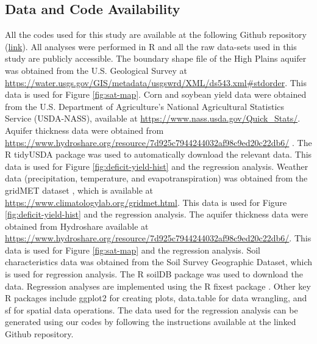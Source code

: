 \documentclass[
]{article}
\begin{document}
\hypertarget{data-and-code-availability}{%
\subsection{Data and Code Availability}\label{data-and-code-availability}}

All the codes used for this study are available at the following Github repository (\href{https://github.com/tmieno2/Drought-Production-Risk-Aquifer}{link}). All analyses were performed in R \citep{R} and all the raw data-sets used in this study are publicly accessible. The boundary shape file of the High Plains aquifer was obtained from the U.S. Geological Survey at \url{https://water.usgs.gov/GIS/metadata/usgswrd/XML/ds543.xml#stdorder}. This data is used for Figure \ref{fig:sat-map}. Corn and soybean yield data were obtained from the U.S. Department of Agriculture's National Agricultural Statistics Service (USDA-NASS), available at \url{https://www.nass.usda.gov/Quick_Stats/}. Aquifer thickness data were obtained from \url{https://www.hydroshare.org/resource/7d925c7944244032af98c9ed20c22db6/} \citep{haacker2023}. The R tidyUSDA package \citep{RtidyUSDA} was used to automatically download the relevant data. This data is used for Figure \ref{fig:deficit-yield-hist} and the regression analysis. Weather data (precipitation, temperature, and evapotranspiration) was obtained from the gridMET dataset \citep{Abatzoglou2013}, which is available at \url{https://www.climatologylab.org/gridmet.html}. This data is used for Figure \ref{fig:deficit-yield-hist} and the regression analysis. The aquifer thickness data were obtained from Hydroshare \citep{haacker2023} available at \url{https://www.hydroshare.org/resource/7d925c7944244032af98c9ed20c22db6/}. This data is used for Figure \ref{fig:sat-map} and the regression analysis. Soil characteristics data was obtained from the Soil Survey Geographic Dataset, which is used for regression analysis. The R soilDB package \citep{Rsoildb} was used to download the data. Regression analyses are implemented using the R fixest package \citep{Rfixest}. Other key R packages include ggplot2 \citep{Rggplot2} for creating plots, data.table \citep{Rdatatable} for data wrangling, and sf \citep{Rsf} for spatial data operations. The data used for the regression analysis can be generated using our codes by following the instructions available at the linked Github repository.

\clearpage

\hypertarget{appendix-appendix}{%
\appendix}
\end{document}
